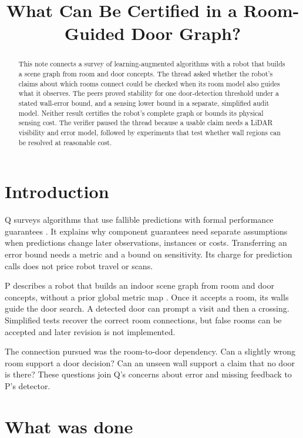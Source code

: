 \documentclass{article}
\title{What Can Be Certified in a Room-Guided Door Graph?}
\begin{document}
\maketitle

\begin{abstract}
This note connects a survey of learning-augmented algorithms with a robot that builds a scene graph from room
and door concepts. The thread asked whether the robot's claims about which rooms connect could be checked when
its room model also guides what it observes. The peers proved stability for one door-detection threshold under
a stated wall-error bound, and a sensing lower bound in a separate, simplified audit model. Neither result
certifies the robot's complete graph or bounds its physical sensing cost. The verifier paused the thread
because a usable claim needs a LiDAR visibility and error model, followed by experiments that test whether
wall regions can be resolved at reasonable cost.
\end{abstract}

\section{Introduction}

Q surveys algorithms that use fallible predictions with formal performance guarantees \cite{Q}. It explains
why component guarantees need separate assumptions when predictions change later observations, instances or
costs. Transferring an error bound needs a metric and a bound on sensitivity. Its charge for prediction calls
does not price robot travel or scans.

P describes a robot that builds an indoor scene graph from room and door concepts, without a prior global
metric map \cite{P}. Once it accepts a room, its walls guide the door search. A detected door can prompt a
visit and then a crossing. Simplified tests recover the correct room connections, but false rooms can be
accepted and later revision is not implemented.

The connection pursued was the room-to-door dependency. Can a slightly wrong room support a door decision? Can
an unseen wall support a claim that no door is there? These questions join Q's concerns about error and
missing feedback to P's detector.

\section{What was done}
\end{document}
